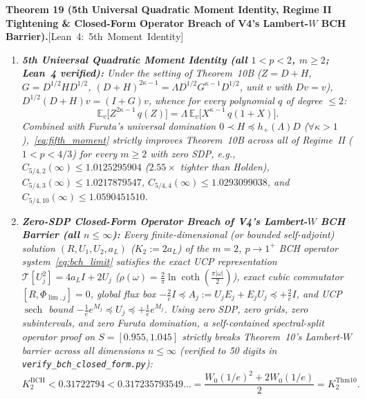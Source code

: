 \documentclass[10pt,letterpaper]{article}
\newcommand{\leanbadge}[1]{\mbox{\sffamily\scriptsize\color{leanborder}[#1]}}
\begin{document}
\begin{tcolorbox}[mathbox]
\textbf{Theorem 19 (5th Universal Quadratic Moment Identity, Regime II Tightening \& Closed-Form Operator Breach of V4's Lambert-$W$ BCH Barrier).}\hfill\leanbadge{Lean~4: 5th Moment Identity}\par\vspace{1.5pt}
\begin{enumerate}[label=(\alph*),leftmargin=1.8em,itemsep=2pt,topsep=2pt]
  \item \emph{\textbf{5th Universal Quadratic Moment Identity (all $1 < p < 2$, $m \ge 2$; Lean~4 verified):} Under the setting of Theorem~10B ($Z = D+H$, $G = D^{1/2} H D^{1/2}$, $(D+H)^{2\kappa-1} = \Lambda D^{1/2} G^{\kappa-1} D^{1/2}$, unit $v$ with $Dv = v$), $D^{1/2}(D+H)v = (I+G)v$, whence for every polynomial $q$ of degree $\le 2$:}
  \begin{equation}\label{eq:fifth_moment}
    \mathbb{E}_v\bigl[Z^{2\kappa - 1}\, q(Z)\bigr] = \Lambda\,\mathbb{E}_v\bigl[X^{\kappa - 1}\, q(1 + X)\bigr].
  \end{equation}
  \emph{Combined with Furuta's universal domination $0 \prec H \preceq h_+(\Lambda) D$ ($\forall \kappa > 1$),~\eqref{eq:fifth_moment} strictly improves Theorem~10B across all of Regime~II ($1 < p < 4/3$) for every $m \ge 2$ with zero SDP, e.g., $C_{5/4,2}(\infty) \le 1.0125295904$ ($2.55\times$ tighter than Holden), $C_{5/4,3}(\infty) \le 1.0217879547$, $C_{5/4,4}(\infty) \le 1.0293099038$, and $C_{5/4,10}(\infty) \le 1.0590451510$.}
  \item \emph{\textbf{Zero-SDP Closed-Form Operator Breach of V4's Lambert-$W$ BCH Barrier (all $n \le \infty$):} Every finite-dimensional (or bounded self-adjoint) solution $(R, U_1, U_2, a_L)$ ($K_2 := 2 a_L$) of the $m = 2$, $p \to 1^+$ BCH operator system~\eqref{eq:bch_limit} satisfies the exact UCP representation $\mathcal{T}[U_j^2] = 4a_L I + 2 U_j$ ($\rho(\omega) = \frac{2}{\pi}\ln\coth(\frac{\pi|\omega|}{2})$), exact cubic commutator $[R, \Phi_{\lim,j}] = 0$, global flux box $-\frac{2}{e} I \preceq A_j := U_j E_j + E_j U_j \preceq +\frac{2}{e} I$, and UCP $\operatorname{sech}$ bound $-\frac{1}{e} e^{M_j} \preceq U_j \preceq +\frac{1}{e} e^{M_j}$. Using zero SDP, zero grids, zero subintervals, and zero Furuta domination, a self-contained spectral-split operator proof on $S = [0.955, 1.045]$ strictly breaks Theorem~10's Lambert-$W$ barrier across all dimensions $n \le \infty$ (verified to 50 digits in \texttt{verify\_bch\_closed\_form.py}):}
  \begin{equation}\label{eq:bch_breach}
    K_2^{\mathrm{BCH}} < 0.31722794 < 0.317235793549\dots = \frac{W_0(1/e)^2 + 2 W_0(1/e)}{2} = K_2^{\mathrm{Thm10}}.
  \end{equation}
\end{enumerate}
\end{tcolorbox}
\end{document}
